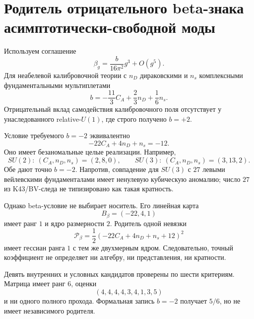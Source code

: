 \chapter{Родитель отрицательного beta-знака асимптотически-свободной моды}
\label{ch:v10-discrete-resolution-af-beta-sign-parent}

Используем соглашение
\begin{equation}
 \beta_g=\frac{b}{16\pi^2}g^3+O(g^5).
\end{equation}
Для неабелевой калибровочной теории с $n_D$ дираковскими и $n_s$
комплексными фундаментальными мультиплетами
\begin{equation}
 b=-\frac{11}{3}C_A+\frac{2}{3}n_D+\frac{1}{6}n_s.
 \label{eq:v10-af-beta-content}
\end{equation}
Отрицательный вклад самодействия калибровочного поля отсутствует у
унаследованного relative-$U(1)$, где строго получено $b=+2$.

Условие требуемого $b=-2$ эквивалентно
\begin{equation}
 -22C_A+4n_D+n_s=-12.
 \label{eq:v10-af-beta-diophantine}
\end{equation}
Оно имеет безаномальные целые реализации. Например,
\begin{equation}
 SU(2):\ (C_A,n_D,n_s)=(2,8,0),\qquad
 SU(3):\ (C_A,n_D,n_s)=(3,13,2).
\end{equation}
Обе дают точно $b=-2$. Напротив, совпадение для $SU(3)$ с $27$
левыми вейлевскими фундаменталами имеет ненулевую кубическую аномалию;
число $27$ из K43/BV-следа не типизировано как такая кратность.

Однако beta-условие не выбирает носитель. Его линейная карта
\begin{equation}
 B_\beta=(-22,4,1)
\end{equation}
имеет ранг $1$ и ядро размерности $2$. Родитель одной невязки
\begin{equation}
 \mathcal P_\beta
 =\frac12(-22C_A+4n_D+n_s+12)^2
\end{equation}
имеет гессиан ранга $1$ с тем же двухмерным ядром. Следовательно, точный
коэффициент не определяет ни алгебру, ни представления, ни кратности.

Девять внутренних и условных кандидатов проверены по шести критериям.
Матрица имеет ранг $6$, оценки
\begin{equation}
 (4,4,4,4,3,4,1,3,5)
\end{equation}
и ни одного полного прохода. Формальная запись $b=-2$ получает $5/6$,
но не имеет независимого родителя.

